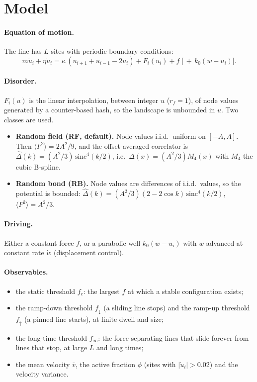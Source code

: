 \documentclass[10pt,a4paper]{article}
\newcommand{\fd}{f_\downarrow}
\newcommand{\fu}{f_\uparrow}
\newcommand{\fcs}{f_c}
\begin{document}
\section{Model}
\label{sec:model}

\paragraph{Equation of motion.}
The line has $L$ sites with periodic boundary conditions:
\begin{equation}
m\ddot u_i+\eta\dot u_i=\kappa\,(u_{i+1}+u_{i-1}-2u_i)+F_i(u_i)+f\;\big[\,+\,k_0(w-u_i)\big].
\label{eq:eom}
\end{equation}

\paragraph{Disorder.}
$F_i(u)$ is the linear interpolation, between integer $u$ ($r_f=1$), of node values generated by a counter-based hash, so the landscape is unbounded in $u$. Two classes are used.
\begin{itemize}
\item \textbf{Random field (RF, default).} Node values i.i.d.\ uniform on $[-A,A]$. Then $\langle F^2\rangle=2A^2/9$, and the offset-averaged correlator is $\hat\Delta(k)=(A^2/3)\,\mathrm{sinc}^4(k/2)$, i.e.\ $\Delta(x)=(A^2/3)M_4(x)$ with $M_4$ the cubic B-spline.
\item \textbf{Random bond (RB).} Node values are differences of i.i.d.\ values, so the potential is bounded: $\hat\Delta(k)=(A^2/3)(2-2\cos k)\,\mathrm{sinc}^4(k/2)$, $\langle F^2\rangle=A^2/3$.
\end{itemize}

\paragraph{Driving.}
Either a constant force $f$, or a parabolic well $k_0(w-u_i)$ with $w$ advanced at constant rate $\dot w$ (displacement control).

\paragraph{Observables.}
\begin{itemize}
\item the static threshold $\fcs$: the largest $f$ at which a stable configuration exists;
\item the ramp-down threshold $\fd$ (a sliding line stops) and the ramp-up threshold $\fu$ (a pinned line starts), at finite dwell and size;
\item the long-time threshold $f_\infty$: the force separating lines that slide forever from lines that stop, at large $L$ and long times;
\item the mean velocity $\bar v$, the active fraction $\phi$ (sites with $|\dot u_i|>0.02$) and the velocity variance.
\end{itemize}
\end{document}
